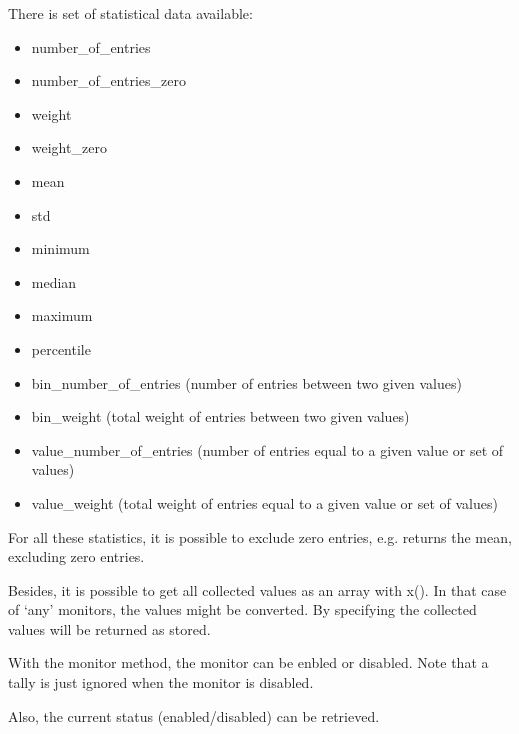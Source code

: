\documentclass[letterpaper,10pt,english]{sphinxmanual}
\begin{document}
There is set of statistical data available:
\begin{itemize}
\item {} 
number\_of\_entries

\item {} 
number\_of\_entries\_zero

\item {} 
weight

\item {} 
weight\_zero

\item {} 
mean

\item {} 
std

\item {} 
minimum

\item {} 
median

\item {} 
maximum

\item {} 
percentile

\item {} 
bin\_number\_of\_entries (number of entries between two given values)

\item {} 
bin\_weight (total weight of entries between two given values)

\item {} 
value\_number\_of\_entries (number of entries equal to a given value or set of values)

\item {} 
value\_weight (total weight of entries equal to a given value or set of values)

\end{itemize}

For all these statistics, it is possible to exclude zero entries,
e.g.  returns the mean, excluding zero entries.

Besides, it is possible to get all collected values as an array with x(). In that case of ‘any’ monitors,
the values might be converted. By specifying  the collected values will be returned as stored.

With the monitor method, the monitor can be enbled or disabled. Note that a tally is just ignored when
the monitor is disabled.

Also, the current status (enabled/disabled) can be retrieved.
\end{document}
